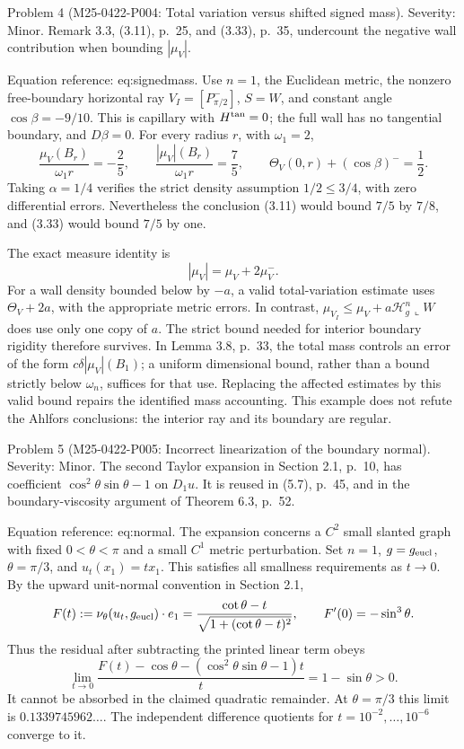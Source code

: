 \documentclass[10pt]{article}
\begin{document}
Problem 4 (M25-0422-P004: Total variation versus shifted signed mass).  Severity: Minor. Remark 3.3, (3.11), p. 25, and (3.33), p. 35, undercount the negative wall contribution when bounding \(|\mu_V|\).\par
Equation reference: eq:signedmass. Use \(n=1\), the Euclidean metric, the nonzero free-boundary horizontal ray \(V_I=[P_{\pi/2}^-]\), \(S=W\), and constant angle \(\cos\beta=-9/10\). This is capillary with \(H^{\rm tan}=0\); the full wall has no tangential boundary, and \(D\beta=0\). For every radius \(r\), with \(\omega_1=2\), \[
 \frac{\mu_V(B_r)}{\omega_1r}=-\frac25,\qquad
 \frac{|\mu_V|(B_r)}{\omega_1r}=\frac75,\qquad
 \Theta_V(0,r)+(\cos\beta)^-=\frac12.\] Taking \(\alpha=1/4\) verifies the strict density assumption \(1/2\leq3/4\), with zero differential errors. Nevertheless the conclusion (3.11) would bound \(7/5\) by \(7/8\), and (3.33) would bound \(7/5\) by one.\par
The exact measure identity is \[|\mu_V|=\mu_V+2\mu_V^- .\] For a wall density bounded below by \(-a\), a valid total-variation estimate uses \(\Theta_V+2a\), with the appropriate metric errors. In contrast, \(\mu_{V_I}\leq\mu_V+a\mathcal H_g^n\!\llcorner W\) does use only one copy of \(a\). The strict bound needed for interior boundary rigidity therefore survives. In Lemma 3.8, p. 33, the total mass controls an error of the form \(c\delta|\mu_V|(B_1)\); a uniform dimensional bound, rather than a bound strictly below \(\omega_n\), suffices for that use. Replacing the affected estimates by this valid bound repairs the identified mass accounting. This example does not refute the Ahlfors conclusions: the interior ray and its boundary are regular.\par
Problem 5 (M25-0422-P005: Incorrect linearization of the boundary normal).  Severity: Minor. The second Taylor expansion in Section 2.1, p. 10, has coefficient \(\cos^2\theta\sin\theta-1\) on \(D_1u\). It is reused in (5.7), p. 45, and in the boundary-viscosity argument of Theorem 6.3, p. 52.\par
Equation reference: eq:normal. The expansion concerns a \(C^2\) small slanted graph with fixed \(0<\theta<\pi\) and a small \(C^1\) metric perturbation. Set \(n=1\), \(g=g_{\rm eucl}\), \(\theta=\pi/3\), and \(u_t(x_1)=t x_1\). This satisfies all smallness requirements as \(t\to0\). By the upward unit-normal convention in Section 2.1, \[
 F(t):=\nu_\theta(u_t,g_{\rm eucl})\cdot e_1
 =\frac{\cot\theta-t}{\sqrt{1+(\cot\theta-t)^2}},\qquad
 F'(0)=-\sin^3\theta.\] Thus the residual after subtracting the printed linear term obeys \[\lim_{t\to0}
 \frac{F(t)-\cos\theta-(\cos^2\theta\sin\theta-1)t}{t}
 =1-\sin\theta>0.\] It cannot be absorbed in the claimed quadratic remainder. At \(\theta=\pi/3\) this limit is \(0.1339745962\ldots\). The independent difference quotients for \(t=10^{-2},\ldots,10^{-6}\) converge to it.\par
\end{document}
